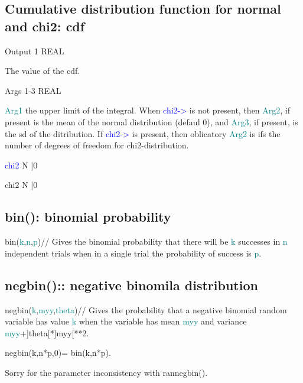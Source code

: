 \begin{itemize}
\subsection{Cumulative distribution function for normal and chi2: \textcolor{VioletRed}{cdf}}
\label{cdf}
\vspace{0.3cm}
\hline
\vspace{0.3cm}
\noindent Output \tabto{3cm}  1  \tabto{5cm}   REAL  \tabto{7cm}
\begin{changemargin}{3cm}{0cm}
\noindent  The value of the cdf.
\end{changemargin}
\vspace{0.3cm}
\hline
\vspace{0.3cm}
\noindent Args  \tabto{3cm}  1-3  \tabto{5cm}   REAL \tabto{7cm}
\begin{changemargin}{3cm}{0cm}
\noindent  \textcolor{teal}{Arg1} the upper limit of the integral. When \textcolor{blue}{chi2->} is not present, then
\textcolor{teal}{Arg2}, if present is the mean of the normal distribution (defaul 0), and \textcolor{teal}{Arg3}, if present,
is the sd of the ditribution. If \textcolor{blue}{chi2->} is present, then oblicatory \textcolor{teal}{Arg2} is
ifs the number of degrees of freedom for chi2-distribution.
\end{changemargin}
\vspace{0.3cm}
\hline
\vspace{0.3cm}
\noindent \textcolor{blue}{chi2}  \tabto{3cm}  N |0  \tabto{5cm}    \tabto{7cm}
\begin{changemargin}{3cm}{0cm}
\noindent \noindent chi2  \tabto{3cm}  N |0  \tabto{5cm}    \tabto{7cm}
\end {changemargin}
\hline
\vspace{0.2cm}
\subsection{\textcolor{VioletRed}{bin}(): binomial probability}
\label{bin}
\textcolor{VioletRed}{bin}(\textcolor{teal}{k},\textcolor{teal}{n},\textcolor{teal}{p})//
Gives the binomial probability that there will be \textcolor{teal}{k} successes
in \textcolor{teal}{n} independent trials when in a
single trial the probability of success is \textcolor{teal}{p}.
\subsection{\textcolor{VioletRed}{negbin}():: negative binomila distribution}
\label{negbin}
\textcolor{VioletRed}{negbin}(\textcolor{teal}{k},\textcolor{teal}{myy},\textcolor{teal}{theta})//
Gives the probability that a negative binomial random variable
has value \textcolor{teal}{k} when the variable
has mean \textcolor{teal}{myy} and variance \textcolor{teal}{myy}+]theta[*]myy[**2.
\begin{note}
\textcolor{VioletRed}{negbin}(k,n*p,0)=
\textcolor{VioletRed}{bin}(k,n*p).
\end{note}
\begin{note}
Sorry for the parameter inconsistency with \textcolor{VioletRed}{rannegbin}().
\end{note}

\end{itemize}
